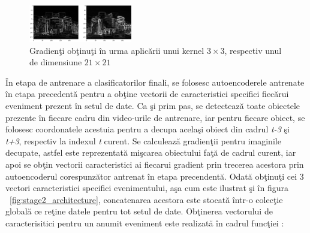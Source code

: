 \documentclass[a4paper,12pt]{report}
\begin{document}
\begin{figure}
	  \begin{center}
        \includegraphics[width=0.4\textwidth]{images/gradients}
        \caption{Gradienţi obţinuţi în urma aplicării unui kernel \(3 \times 3 \), respectiv unul de dimensiune   \(21 \times 21 \)}
			\label{fig:gradient_kernel}
    \end{center}
\end{figure}
\par
În etapa de antrenare a clasificatorilor finali, se folosesc autoencoderele antrenate în etapa precedentă pentru a obţine vectorii de caracteristici specifici fiecărui eveniment prezent în setul de date. Ca şi prim pas, se detectează toate obiectele prezente în fiecare cadru din video-urile  de antrenare, iar pentru fiecare obiect, se folosesc coordonatele acestuia pentru a decupa acelaşi obiect din cadrul \emph{t-3} şi \emph{t+3}, respectiv la indexul \emph{t} curent. Se calculează gradienţii pentru imaginile decupate, astfel este reprezentată mişcarea obiectului faţă de cadrul curent, iar apoi se obţin vectorii caracteristici ai fiecarui gradient prin trecerea acestora prin autoencoderul corespunzător antrenat în etapa precendentă. Odată obţinuţi cei 3 vectori caracteristici specifici evenimentului, aşa cum este ilustrat şi în figura ~\ref{fig:stage2_architecture}, concatenarea acestora este stocată într-o colecţie globală ce reţine datele pentru tot setul de date.
Obţinerea vectorului de caracterisitici pentru un anumit eveniment este realizată în cadrul funcţiei :
\\
\end{document}

